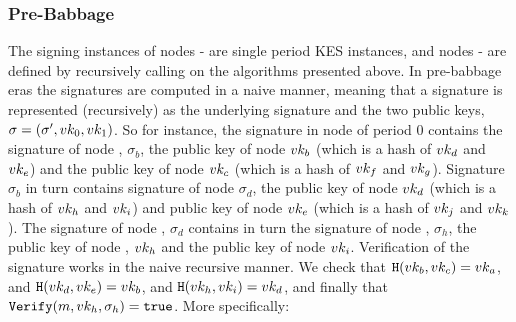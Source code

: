 \subsubsection{Pre-Babbage}
The signing instances of nodes - are single period KES instances, and nodes
- are defined by recursively calling on the algorithms presented above.
In pre-babbage eras the signatures are computed in a naive manner, meaning
that a signature is represented (recursively) as the underlying signature and the two public keys,
$\sigma = (\sigma', vk_0,vk_1)$.
So for instance, the signature in node  of period 0 contains the signature of node ,
$\sigma_b$, the public key of node  $vk_b$ (which is a hash of $vk_d$ and $vk_e$) and the public key
of node  $vk_c$ (which is a hash of $vk_f$ and $vk_g$). Signature $\sigma_b$ in turn contains
signature of node  $\sigma_d$, the public key of node  $vk_d$ (which is a hash of $vk_h$
and $vk_i$) and public key of node  $vk_e$ (which is a hash of $vk_j$ and $vk_k$). The signature of
node , $\sigma_d$ contains in turn the signature of node , $\sigma_h$, the public key
of node , $vk_h$ and the public key of node  $vk_i$. Verification of the signature works in
the naive recursive manner. We check that $\texttt{H}(vk_b, vk_c) = vk_a$, and $\texttt{H}(vk_d, vk_e) = vk_b$, and
$\texttt{H}(vk_h, vk_i) = vk_d$, and finally that $\texttt{Verify}(m, vk_h, \sigma_h) = \texttt{true}$.
More specifically:
